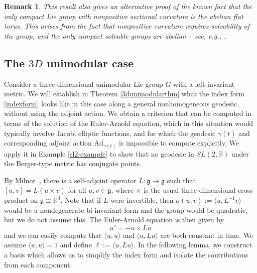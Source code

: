 \documentclass[oneside, 11pt]{amsart}
\newtheorem{remark}[theorem]{Remark}
\numberwithin{equation}{section}
\newcommand{\Ad}{\mathrm{Ad}}
\newcommand{\simpkill}{\kappa}
\begin{document}
\begin{remark}\label{torus}
This result also gives an alternative proof of the known fact that the only compact Lie group with nonpositive sectional curvature is the abelian flat torus. This arises from the fact that nonpositive curvature requires solvability of the group, and the only compact solvable groups are abelian -- see, e.g., \cite{Knapp}. 
\end{remark}
 
    
 
 
 
 
  



\subsection{The $3D$ unimodular case}\label{milnornonsteadythm}
 
Consider a three-dimensional unimodular Lie group $G$ with a left-invariant metric. We will establish in Theorem \ref{3dunimodularthm} what the index form \eqref{indexform} looks like in this case along a general nonhomogeneous geodesic, without using the adjoint action. We obtain a criterion that can be computed in terms of the solution of the Euler-Arnold equation, which in this situation would typically involve Jacobi elliptic functions, and for which the geodesic $\gamma(t)$ and corresponding adjoint action $\Ad_{\gamma(t)}$ is impossible to compute explicitly. We apply it in Example \ref{sl2-example} to show that no geodesic in $SL(2,\mathbb{R})$ under the Berger-type metric has conjugate points.


By Milnor~\cite{Milnor}, there is a self-adjoint operator $L\colon \mathfrak{g}\to\mathfrak{g}$ such that $[u,v] = L(u\times v)$ for all $u,v\in \mathfrak{g}$, where $\times$ is the usual three-dimensional cross product on $\mathfrak{g}\cong \mathbb{R}^3$. Note that if $L$ were %
invertible, then $\simpkill(u,v) := \langle u, L^{-1}v\rangle$ would be a nondegenerate bi-invariant form and the group would be quadratic, but we do not assume this. The Euler-Arnold equation is then given by 
\begin{equation}\label{eulerarnoldmilnor}
u' = -u\times Lu
\end{equation}
and we can easily compute that $\langle u,u\rangle$ and $\langle u, Lu\rangle$ are both constant in time. We assume $\langle u,u\rangle = 1$ and define $\ell := \langle u, Lu\rangle$. In the following lemma, we construct a basis which allows us to simplify the index form and isolate the contributions from each component.
\end{document}
